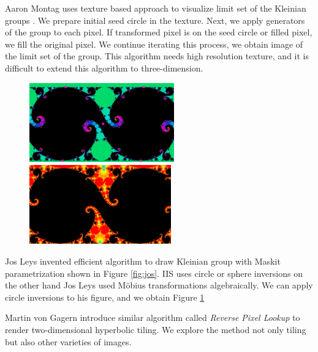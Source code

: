 Aaron Montag uses texture based approach to visualize limit set of the
Kleinian groups \cite{Montag2014hyperbolicIFS}.
We prepare initial seed circle in the texture.
Next, we apply generators of the group to each pixel.
If transformed pixel is on the seed circle or filled pixel, we fill the original pixel.
We continue iterating this process, we obtain image of the limit set of
the group.
This algorithm needs high resolution texture, and it is difficult to
extend this algorithm to three-dimension.

\begin{figure}[htbp]
 \begin{minipage}[t]{0.5\hsize}
  \center
  \includegraphics[height=1.35in, keepaspectratio]{img/preparation/related/josklein.png}
  \caption{\textit{}}
  \label{fig:jos}
  \hspace*{\fill}
 \end{minipage}
 \begin{minipage}[t]{0.5\hsize}
  \center
  \includegraphics[height=1.35in, keepaspectratio]{img/preparation/related/joskleinInv.png}
  \caption{\textit{}}
  \label{fig:josInv}
  \hspace*{\fill}
 \end{minipage}
\end{figure}

Jos Leys invented efficient algorithm to draw Kleinian group with Maskit
parametrization shown in Figure \ref{fig:jos}.
IIS uses circle or sphere inversions on the other hand Jos Leys used
M\"obius transformations algebraically.
We can apply circle inversions to his figure, and we obtain Figure \ref{fig:josInv}

Martin von Gagern introduce similar algorithm called \textit{Reverse
Pixel Lookup} \cite{journals/combinatorics/GagernR09} to render
two-dimensional hyperbolic tiling.
We explore the method not only tiling but also other varieties of
images.
